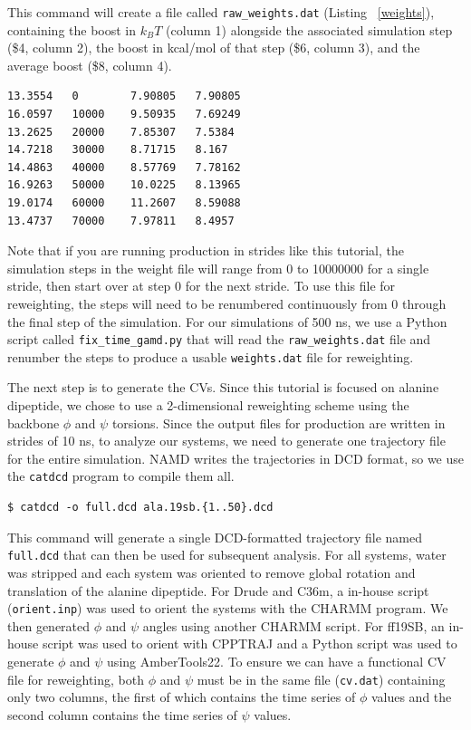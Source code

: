 \documentclass[9pt,tutorial]{livecoms}
\begin{document}
This command will create a file called \texttt{raw\_weights.dat} (Listing ~\ref{weights}), containing the boost in $k_{B}T$ (column 1) alongside the associated simulation step (\$4, column 2), the boost in kcal/mol of that step (\$6, column 3), and the average boost (\$8, column 4). 


\begin{lstlisting}[label=weights, caption=raw\_weights.dat, basicstyle=\small, backgroundcolor=\color{light-gray}]
13.3554   0 	   7.90805 	 7.90805
16.0597   10000    9.50935 	 7.69249
13.2625	  20000    7.85307 	 7.5384
14.7218   30000    8.71715 	 8.167
14.4863   40000    8.57769 	 7.78162
16.9263   50000    10.0225 	 8.13965
19.0174   60000    11.2607 	 8.59088
13.4737   70000    7.97811 	 8.4957
\end{lstlisting}

Note that if you are running production in strides like this tutorial, the simulation steps in the weight file will range from 0 to 10000000 for a single stride, then start over at step 0 for the next stride. To use this file for reweighting, the steps will need to be renumbered continuously from 0 through the final step of the simulation. For our simulations of 500 ns, we use a Python script called \texttt{fix\_time\_gamd.py} that will read the \texttt{raw\_weights.dat} file and renumber the steps to produce a usable \texttt{weights.dat} file for reweighting. 

The next step is to generate the CVs. Since this tutorial is focused on alanine dipeptide, we chose to use a 2-dimensional reweighting scheme using the backbone $\phi$ and $\psi$ torsions. Since the output files for production are written in strides of 10 ns, to analyze our systems, we need to generate one trajectory file for the entire simulation. NAMD writes the trajectories in DCD format, so we use the \texttt{catdcd} program to compile them all.

\begin{lstlisting}[style=MyBash]
$ catdcd -o full.dcd ala.19sb.{1..50}.dcd
\end{lstlisting}

This command will generate a single DCD-formatted trajectory file named \texttt{full.dcd} that can then be used for subsequent analysis. For all systems, water was stripped and each system was oriented to remove global rotation and translation of the alanine dipeptide. For Drude and C36m, a in-house script (\texttt{orient.inp}) was used to orient the systems with the CHARMM program. We then generated $\phi$ and $\psi$ angles using another CHARMM script. For ff19SB, an in-house script was used to orient with CPPTRAJ and a Python script was used to generate $\phi$ and $\psi$ using AmberTools22. To ensure we can have a functional CV file for reweighting, both $\phi$ and $\psi$ must be in the same file (\texttt{cv.dat}) containing only two columns, the first of which contains the time series of $\phi$ values and the second column contains the time series of $\psi$ values.
\end{document}
